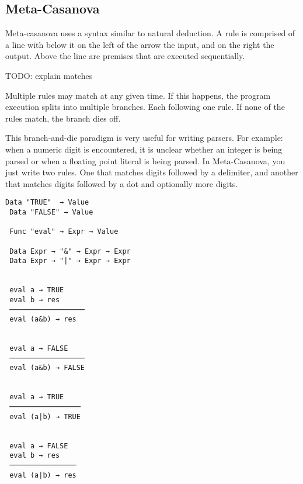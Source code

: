 \subsection{Meta-Casanova}
\begin{multicols}{2}
  Meta-casanova uses a syntax similar to natural deduction.
  A rule is comprised of a line with below it on the left of the arrow the input, and on the right the output.
  Above the line are premises that are executed sequentially.

  TODO: explain matches

  Multiple rules may match at any given time.
  If this happens, the program execution splits into multiple branches.
  Each following one rule.
  If none of the rules match, the branch dies off. 
  
  This branch-and-die paradigm is very useful for writing parsers.
  For example: when a numeric digit is encountered, it is unclear whether an integer is being parsed or when a floating point literal is being parsed. 
  In Meta-Casanova, you just write two rules. One that matches digits followed by a delimiter, and another that matches digits followed by a dot and optionally more digits.

\minipage{\linewidth}\begin{lstlisting}[caption=A Boolean expression interpreter in Meta-Casanova.]
 Data "TRUE"  → Value
 Data "FALSE" → Value
 
 Func "eval" → Expr → Value
 
 Data Expr → "&" → Expr → Expr
 Data Expr → "|" → Expr → Expr
 
 
 eval a → TRUE
 eval b → res
 ──────────────────
 eval (a&b) → res
 
 
 eval a → FALSE
 ──────────────────
 eval (a&b) → FALSE
 
 
 eval a → TRUE
 ─────────────────
 eval (a|b) → TRUE
 
 
 eval a → FALSE
 eval b → res
 ────────────────
 eval (a|b) → res
\end{lstlisting}\endminipage
\end{multicols}
